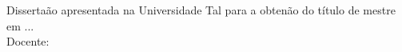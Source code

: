 \begin{titlepage}
  \begin{center}
    \Large{\AUTOR}\\[10cm]
    \Large{\textbf{\TITULO}}\\[2cm]
    \hspace{.45\textwidth} %
    \begin{minipage}{.5\textwidth}
      \begin{normalsize}
        Disserta\cc\~ao apresentada na Universidade Tal para a obten\cc\~ao do t\'itulo de mestre em ...\\[1.5cm]
        Docente: \ORIENTADOR
      \end{normalsize}
    \end{minipage}
    \vfill

    \begin{normalsize}
      \LOCAL\\
      \DATA
    \end{normalsize}
  \end{center}
\end{titlepage}
